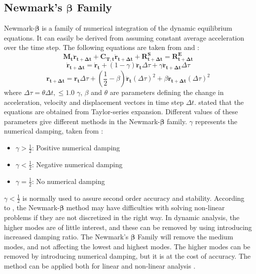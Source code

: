 \subsection{Newmark's $\boldsymbol{\beta}$ Family}
\label{sec:newmark}
Newmark-$\boldsymbol{\beta}$ is a family of numerical integration of the dynamic equilibrium equations. It can easily be derived from assuming constant average acceleration over the time step. The following equations are taken from \cite{sintef2017} and \cite{Mathisen1990} : 
\begin{equation}
   \boldsymbol{M_t \ddot{r}_{t+\Delta t}} + \boldsymbol{C_{T,t}\dot{r}_{t+\Delta t}} + \boldsymbol{R_{t+\Delta t}^S}=\boldsymbol{{R_{t+\Delta t}^E}}
   \label{eq:new}
\end{equation}
\begin{equation}
    \boldsymbol{\dot{r}_{t+\Delta t}} =\boldsymbol{\dot{r}_{t}}+(1-\gamma)\boldsymbol{\ddot{r}_{t}}\Delta \tau + \gamma \boldsymbol{\ddot{r}_{t+\Delta t}} \Delta \tau
\end{equation}
\begin{equation}
    \boldsymbol{r_{t+\Delta t}} =\boldsymbol{r_{t}}\Delta \tau + (\frac{1}{2}-\beta)\boldsymbol{\ddot{r}_{t}}(\Delta \tau)^2 + \beta \boldsymbol{\ddot{r}_{t+\Delta t}} (\Delta \tau)^2
\end{equation}
where  $\Delta \tau =\theta \Delta t, \leq 1.0$\newline
\newline
$\gamma$, $\beta$ and $\theta$ are parameters defining the change in acceleration, velocity and displacement vectors in time step $\Delta t$. \cite{Langen1999} stated that  the equations are obtained from Taylor-series expansion.  Different values of these parameters give different methods in the Newmark-$\boldsymbol{\beta}$ family. $\gamma$ represents the numerical damping, taken from \cite{sintef2017}: 
\begin{itemize}
    \item $\gamma > \frac{1}{2}$: Positive numerical damping
    \item $\gamma < \frac{1}{2}$: Negative numerical damping
    \item $\gamma = \frac{1}{2}$: No numerical damping
\end{itemize}

\noindent $\gamma < \frac{1}{2}$ is normally used to assure second order accuracy and stability. 
According to \cite{Mathisen1990}, the Newmark-$\boldsymbol{\beta}$ method may have difficulties with solving non-linear problems if they are not discretized in the right way. \newline
\newline
\noindent In dynamic analysis, the higher modes are of little interest, and these can be removed by using introducing increased damping ratio. The Newmark's $\boldsymbol{\beta}$ Family will remove the medium modes, and not affecting the lowest and highest modes. The higher modes can be removed by introducing numerical damping, but it is at the cost of accuracy.  The method can be applied both for linear and non-linear analysis \cite{sintef2017}.

